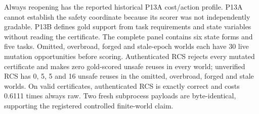 \markdownRendererInterblockSeparator
{}Always reopening has the reported historical P13A cost/action profile. P13A cannot establish the safety coordinate because its scorer was not independently gradable.\markdownRendererInterblockSeparator
{}
\markdownRendererSectionEnd \markdownRendererSectionBegin
{}\markdownRendererInterblockSeparator
{}P13B defines gold support from task requirements and state variables without reading the certificate. The complete panel contains six state forms and five tasks. Omitted, overbroad, forged and stale-epoch worlds each have 30 live mutation opportunities before scoring. Authenticated RCS rejects every mutated certificate and makes zero gold-scored unsafe reuses in every world; unverified RCS has 0, 5, 5 and 16 unsafe reuses in the omitted, overbroad, forged and stale worlds. On valid certificates, authenticated RCS is exactly correct and costs 0.6111 times always raw. Two fresh subprocess payloads are byte-identical, supporting the registered controlled finite-world claim.
\markdownRendererSectionEnd 
\markdownRendererSectionEnd \markdownRendererDocumentEnd